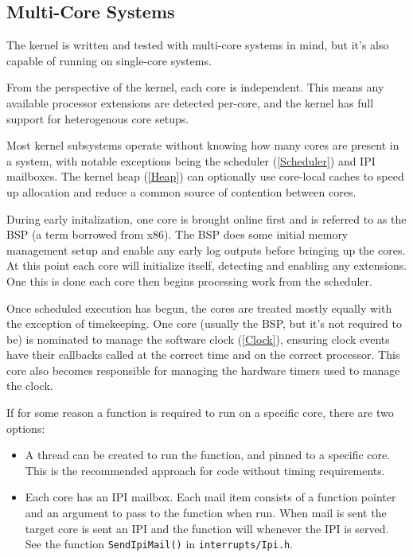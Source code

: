 \subsection{Multi-Core Systems}
The kernel is written and tested with multi-core systems in mind, but it's also capable of running on single-core systems. 

From the perspective of the kernel, each core is independent. This means any available processor extensions are detected per-core, and the kernel has full support for heterogenous core setups.

Most kernel subsystems operate without knowing how many cores are present in a system, with notable exceptions being the scheduler (\autoref{Scheduler}) and IPI mailboxes. The kernel heap (\autoref{Heap}) can optionally use core-local caches to speed up allocation and reduce a common source of contention between cores.

During early initalization, one core is brought online first and is referred to as the BSP (a term borrowed from x86). The BSP does some initial memory management setup and enable any early log outputs before bringing up the cores. At this point each core will initialize itself, detecting and enabling any extensions. One this is done each core then begins processing work from the scheduler.

Once scheduled execution has begun, the cores are treated mostly equally with the exception of timekeeping. One core (usually the BSP, but it's not required to be) is nominated to manage the software clock (\autoref{Clock}), ensuring clock events have their callbacks called at the correct time and on the correct processor. This core also becomes responsible for managing the hardware timers used to manage the clock.

If for some reason a function is required to run on a specific core, there are two options:
\begin{itemize}
    \item A thread can be created to run the function, and pinned to a specific core. This is the recommended approach for code without timing requirements.
    \item Each core has an IPI mailbox. Each mail item consists of a function pointer and an argument to pass to the function when run. When mail is sent the target core is sent an IPI and the function will whenever the IPI is served. See the function \verb|SendIpiMail()| in \verb|interrupts/Ipi.h|.
\end{itemize}

